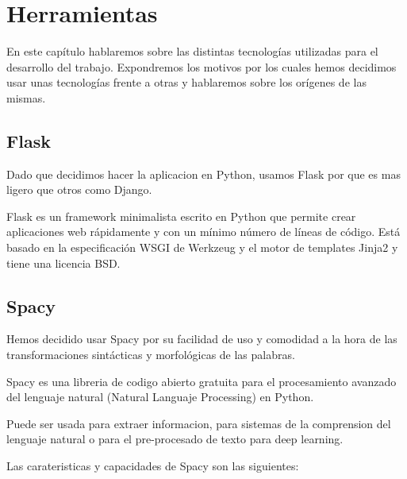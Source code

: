 \chapter{Herramientas}
\label{cap:herramientas}


En este capítulo hablaremos sobre las distintas tecnologías utilizadas para el desarrollo del trabajo. Expondremos los motivos por los cuales hemos decidimos usar unas tecnologías frente a otras y hablaremos sobre los
orígenes de las mismas.


\section{Flask}\label{sec:flask}
Dado que decidimos hacer la aplicacion en Python, usamos Flask por que es mas ligero que otros como Django.

Flask es un framework minimalista escrito en Python que permite crear aplicaciones web rápidamente y con un mínimo número de líneas de código. Está basado en la especificación WSGI de Werkzeug y el motor de templates Jinja2 y tiene una licencia BSD.

\section{Spacy}\label{sec:spacy}
Hemos decidido usar Spacy por su facilidad de uso y comodidad a la hora de las transformaciones sintácticas y morfológicas de las palabras.

Spacy es una libreria de codigo abierto gratuita para el procesamiento avanzado del lenguaje natural (Natural Languaje Processing) en Python.

Puede ser usada para extraer informacion, para sistemas de la comprension del lenguaje natural o para el pre-procesado de texto para deep learning.

Las carateristicas y capacidades de Spacy son las siguientes:

